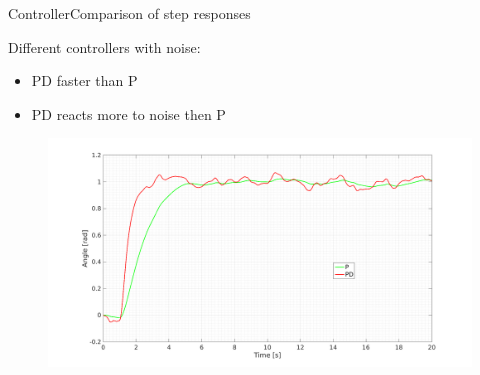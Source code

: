 \begin{frame}{Controller}{Comparison of step responses}
  \begin{block}{Different controllers with noise:}

	  \begin{itemize}
	  	\item PD faster than P
	  	\item PD reacts more to noise then P
	  \end{itemize}

	  \begin{figure}
        \includegraphics[scale=0.18]{../report/figures/PD_noise.png}
      \end{figure}
  
  \end{block}
\end{frame}

%
%
%
%
%  




